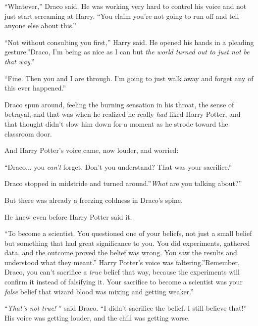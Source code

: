 ``Whatever,'' Draco said. He was working very hard to control his voice
and not just start screaming at Harry. ``You claim you're not going to
run off and tell anyone else about this.''

``Not without consulting you first,'' Harry said. He opened his hands in
a pleading gesture.''Draco, I'm being as nice as I can but \emph{the
world turned out to just not be that way}.''

``Fine. Then you and I are through. I'm going to just walk away and
forget any of this ever happened.''

Draco spun around, feeling the burning sensation in his throat, the
sense of betrayal, and that was when he realized he really \emph{had}
liked Harry Potter, and that thought didn't slow him down for a moment
as he strode toward the classroom door.

And Harry Potter's voice came, now louder, and worried:

``Draco... you \emph{can't} forget. Don't you understand? That was
your sacrifice.''

Draco stopped in midstride and turned around.''\emph{What} are you
talking about?''

But there was already a freezing coldness in Draco's spine.

He knew even before Harry Potter said it.

``To become a scientist. You questioned one of your beliefs, not just a
small belief but something that had great significance to you. You did
experiments, gathered data, and the outcome proved the belief was wrong.
You saw the results and understood what they meant.'' Harry Potter's
voice was faltering.''Remember, Draco, you can't sacrifice a \emph{true}
belief that way, because the experiments will confirm it instead of
falsifying it. Your sacrifice to become a scientist was your
\emph{false} belief that wizard blood was mixing and getting weaker.''

``\emph{That's not true!} '' said Draco. ``I didn't sacrifice the belief.
I still believe that!'' His voice was getting louder, and the chill was
getting worse.

